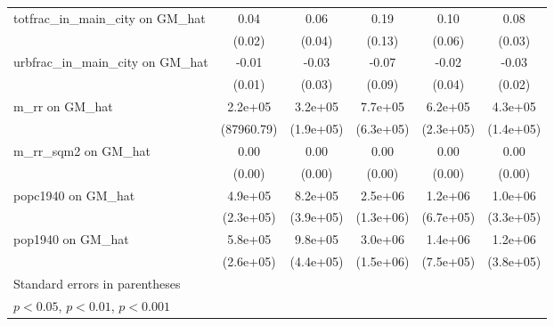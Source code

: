 \begin{table}[htbp]
\begin{tabular}{l*{5}{c}}
\addlinespace
totfrac\_in\_main\_city on GM\_hat&     0.04         &     0.06         &     0.19         &     0.10         &     0.08\sym{*}  \\
                &   (0.02)         &   (0.04)         &   (0.13)         &   (0.06)         &   (0.03)         \\
\addlinespace
urbfrac\_in\_main\_city on GM\_hat&    -0.01         &    -0.03         &    -0.07         &    -0.02         &    -0.03         \\
                &   (0.01)         &   (0.03)         &   (0.09)         &   (0.04)         &   (0.02)         \\
\addlinespace
m\_rr on GM\_hat  &  2.2e+05\sym{*}  &  3.2e+05         &  7.7e+05         &  6.2e+05\sym{**} &  4.3e+05\sym{**} \\
                &(87960.79)         &(1.9e+05)         &(6.3e+05)         &(2.3e+05)         &(1.4e+05)         \\
\addlinespace
m\_rr\_sqm2 on GM\_hat&     0.00         &     0.00         &     0.00\sym{*}  &     0.00         &     0.00\sym{**} \\
                &   (0.00)         &   (0.00)         &   (0.00)         &   (0.00)         &   (0.00)         \\
\addlinespace
popc1940 on GM\_hat&  4.9e+05\sym{*}  &  8.2e+05\sym{*}  &  2.5e+06         &  1.2e+06         &  1.0e+06\sym{**} \\
                &(2.3e+05)         &(3.9e+05)         &(1.3e+06)         &(6.7e+05)         &(3.3e+05)         \\
\addlinespace
pop1940 on GM\_hat&  5.8e+05\sym{*}  &  9.8e+05\sym{*}  &  3.0e+06\sym{*}  &  1.4e+06         &  1.2e+06\sym{**} \\
                &(2.6e+05)         &(4.4e+05)         &(1.5e+06)         &(7.5e+05)         &(3.8e+05)         \\
\bottomrule
\multicolumn{6}{l}{\footnotesize Standard errors in parentheses}\\
\multicolumn{6}{l}{\footnotesize \sym{*} \(p<0.05\), \sym{**} \(p<0.01\), \sym{***} \(p<0.001\)}\\
\end{tabular}
\end{table}
